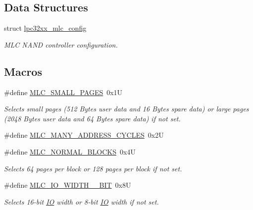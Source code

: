 \subsection*{Data Structures}
\begin{DoxyCompactItemize}
\item 
struct \mbox{\hyperlink{structlpc32xx__mlc__config}{lpc32xx\+\_\+mlc\+\_\+config}}
\begin{DoxyCompactList}\small\item\em M\+LC N\+A\+ND controller configuration. \end{DoxyCompactList}\end{DoxyCompactItemize}
\subsection*{Macros}
\begin{DoxyCompactItemize}
\item 
\mbox{\label{group__lpc32xx__nand__mlc_ga9e8da612c0810fcabd6d72203134dd65}} 
\#define \mbox{\hyperlink{group__lpc32xx__nand__mlc_ga9e8da612c0810fcabd6d72203134dd65}{M\+L\+C\+\_\+\+S\+M\+A\+L\+L\+\_\+\+P\+A\+G\+ES}}~0x1U
\begin{DoxyCompactList}\small\item\em Selects small pages (512 Bytes user data and 16 Bytes spare data) or large pages (2048 Bytes user data and 64 Bytes spare data) if not set. \end{DoxyCompactList}\item 
\#define \mbox{\hyperlink{group__lpc32xx__nand__mlc_gaa02b2b76bde2195a15a66128a3643517}{M\+L\+C\+\_\+\+M\+A\+N\+Y\+\_\+\+A\+D\+D\+R\+E\+S\+S\+\_\+\+C\+Y\+C\+L\+ES}}~0x2U
\item 
\#define \mbox{\hyperlink{group__lpc32xx__nand__mlc_ga438ea163775acc06c4b1d516aadb1d37}{M\+L\+C\+\_\+\+N\+O\+R\+M\+A\+L\+\_\+\+B\+L\+O\+C\+KS}}~0x4U
\begin{DoxyCompactList}\small\item\em Selects 64 pages per block or 128 pages per block if not set. \end{DoxyCompactList}\item 
\mbox{\label{group__lpc32xx__nand__mlc_gae60c5844b85dd6758e12d1257b06ce33}} 
\#define \mbox{\hyperlink{group__lpc32xx__nand__mlc_gae60c5844b85dd6758e12d1257b06ce33}{M\+L\+C\+\_\+\+I\+O\+\_\+\+W\+I\+D\+T\+H\+\_\+\_\+\+B\+IT}}~0x8U
\begin{DoxyCompactList}\small\item\em Selects 16-\/bit \mbox{\hyperlink{structIO}{IO}} width or 8-\/bit \mbox{\hyperlink{structIO}{IO}} width if not set. \end{DoxyCompactList}\end{DoxyCompactItemize}
